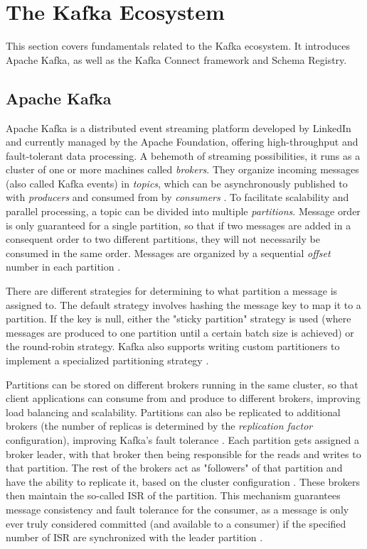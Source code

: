 \section{The Kafka Ecosystem}
\label{ch02:fundamentals:apachekafkaandkafkaconnect}
This section covers fundamentals related to the Kafka ecosystem. It introduces Apache Kafka, as well as the Kafka Connect framework and Schema Registry.
\subsection{Apache Kafka}
\label{ch02:fundamentals:apachekafkaandkafkaconnect:apachekafka}
Apache Kafka is a distributed event streaming platform developed by LinkedIn and currently managed by the Apache Foundation, offering high-throughput and fault-tolerant data processing. A behemoth of streaming possibilities, it runs as a cluster of one or more machines called \textit{brokers}. They organize incoming messages (also called Kafka events) in \textit{topics}, which can be asynchronously published to with \textit{producers} and consumed from by \textit{consumers} \cite{peddireddystreamliningprocessingkafka}. To facilitate scalability and parallel processing, a topic can be divided into multiple \textit{partitions}. Message order is only guaranteed for a single partition, so that if two messages are added in a consequent order to two different partitions, they will not necessarily be consumed in the same order. Messages are organized by a sequential \textit{offset} number in each partition \cite{thein2014apache}.

There are different strategies for determining to what partition a message is assigned to. The default strategy involves hashing the message key to map it to a partition. If the key is null, either the "sticky partition" strategy is used (where messages are produced to one partition until a certain batch size is achieved) or the round-robin strategy. Kafka also supports writing custom partitioners to implement a specialized partitioning strategy  \cite{kafkadocumentation}.

Partitions can be stored on different brokers running in the same cluster, so that client applications can consume from and produce to different brokers, improving load balancing and scalability. Partitions can also be replicated to additional brokers (the number of replicas is determined by the \textit{replication factor} configuration), improving Kafka's fault tolerance \cite{thein2014apache}. Each partition gets assigned a broker leader, with that broker then being responsible for the reads and writes to that partition. The rest of the brokers act as "followers" of that partition and have the ability to replicate it, based on the cluster configuration \cite{petrescukafkaraft}. These brokers then maintain the so-called \ac{ISR} of the partition. This mechanism guarantees message consistency and fault tolerance for the consumer, as a message is only ever truly considered committed (and available to a consumer) if the specified number of \ac{ISR} are synchronized with the leader partition \cite{kafkadocumentation}.


